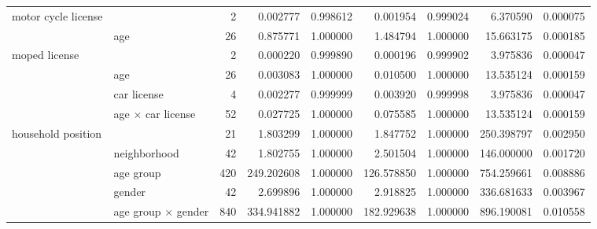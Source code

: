 \begin{tabular}{ll|r|rr|rr|rr}
\cline{1-9}
\multirow[t]{2}{*}{motor cycle license} &  & 2 & 0.002777 & 0.998612 & 0.001954 & 0.999024 & 6.370590 & 0.000075 \\
 & age & 26 & 0.875771 & 1.000000 & 1.484794 & 1.000000 & 15.663175 & 0.000185 \\
\cline{1-9}
\multirow[t]{4}{*}{moped license} &  & 2 & 0.000220 & 0.999890 & 0.000196 & 0.999902 & 3.975836 & 0.000047 \\
 & age & 26 & 0.003083 & 1.000000 & 0.010500 & 1.000000 & 13.535124 & 0.000159 \\
 & car license & 4 & 0.002277 & 0.999999 & 0.003920 & 0.999998 & 3.975836 & 0.000047 \\
 & age $\times$ car license & 52 & 0.027725 & 1.000000 & 0.075585 & 1.000000 & 13.535124 & 0.000159 \\
\cline{1-9}
\multirow[t]{5}{*}{household position} &  & 21 & 1.803299 & 1.000000 & 1.847752 & 1.000000 & 250.398797 & 0.002950 \\
 & neighborhood & 42 & 1.802755 & 1.000000 & 2.501504 & 1.000000 & 146.000000 & 0.001720 \\
 & age group & 420 & 249.202608 & 1.000000 & 126.578850 & 1.000000 & 754.259661 & 0.008886 \\
 & gender & 42 & 2.699896 & 1.000000 & 2.918825 & 1.000000 & 336.681633 & 0.003967 \\
 & age group $\times$ gender & 840 & 334.941882 & 1.000000 & 182.929638 & 1.000000 & 896.190081 & 0.010558 \\
\cline{1-9}
\bottomrule
\end{tabular}

